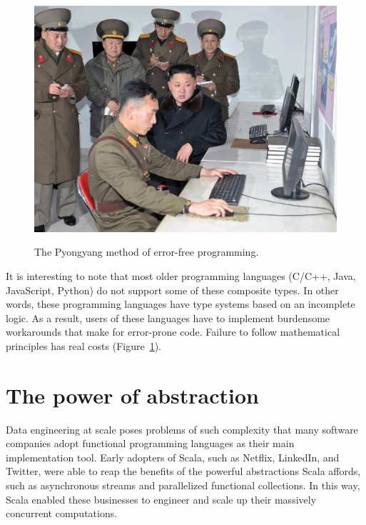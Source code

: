 \begin{figure}%
\begin{centering}
\vspace{-0.5\baselineskip}
{\footnotesize{}\includegraphics[width=1\linewidth]{no-bugs}}\vspace{-0.5\baselineskip}
\par\end{centering}
\caption{The Pyongyang method of error-free programming.\label{fig:The-Pyongyang-method-of-error-free-programming}}
\vspace{-3\baselineskip}
\end{figure}%

It is interesting to note that most older programming languages (C/C++,
Java, JavaScript, Python) do not support some of these composite types.
In other words, these programming languages have type systems based
on an incomplete logic. As a result, users of these languages have
to implement burdensome workarounds that make for error-prone code.
Failure to follow mathematical principles has real costs (Figure~\ref{fig:The-Pyongyang-method-of-error-free-programming}).

\section{The power of abstraction}

Data engineering at scale poses problems of such complexity that many
software companies adopt functional programming languages as their
main implementation tool. Early adopters of Scala, such as Netflix,
LinkedIn, and Twitter, were able to reap the benefits of the powerful
abstractions Scala affords, such as asynchronous streams and parallelized
functional collections. In this way, Scala enabled these businesses
to engineer and scale up their massively concurrent computations. 

